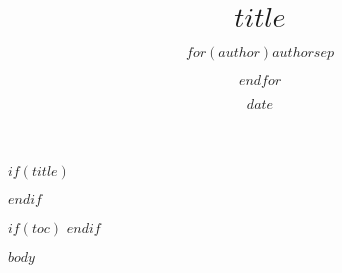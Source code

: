 \documentclass[$if(fontsize)$$fontsize$,$endif$$if(lang)$$babel-lang$,$endif$$if(papersize)$$papersize$paper,$endif$$for(classoption)$$classoption$$sep$,$endfor$]{$if(documentclass)$$documentclass$$else$article$endif$}
\title{$title$}
\author{$for(author)$$author$$sep$ \and $endfor$}
\date{$date$}
\begin{document}
$if(title)$
\maketitle
$endif$

$if(toc)$
\tableofcontents
\newpage
$endif$

$body$
\end{document}

